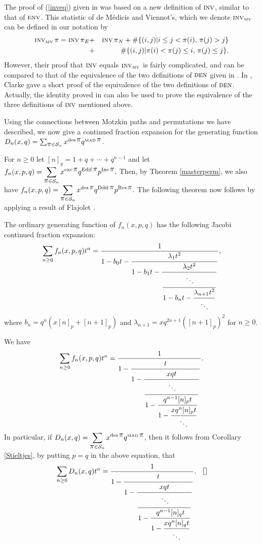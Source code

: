 The proof of (\ref{inveq}) given in \cite{medvie} was based on a new definition
of $\mathop{\mbox{\sc inv}}\nolimits$, similar to that of $\mathop{\mbox{\sc env}}\nolimits$. This statistic of de M\'edicis and
Viennot's, which we denote $\mathop{\mbox{\sc inv}}_{\mbox{$\rm\scriptscriptstyle MV$}}\nolimits$ can be defined in our notation by
\begin{eqnarray}
\mathop{\mbox{\sc inv}}_{\mbox{$\rm\scriptscriptstyle MV$}}\nolimits \mbox{$\pi$} =\mathop{\mbox{\sc inv}}\nolimits \mbox{$\pi$}_E&+&\mathop{\mbox{\sc inv}}\nolimits \mbox{$\pi$}_N +\#\{(i,j)|i\leq j<\mbox{$\pi$}(i),\,
\mbox{$\pi$}(j)> j\}\label{invbis}\cr &+&\#\{(i,j)|\mbox{$\pi$}(i)<\mbox{$\pi$}(j)\leq i, \, \mbox{$\pi$}(j)\leq j\}.
\end{eqnarray}
However, their proof that $\mathop{\mbox{\sc inv}}\nolimits$ equals $\mathop{\mbox{\sc inv}}_{\mbox{$\rm\scriptscriptstyle MV$}}\nolimits$ is fairly
complicated, and can be compared to that of the equivalence of the two
definitions of $\mathop{\mbox{\sc den}}\nolimits$ given in \cite{FZ}. In \cite{clarke}, Clarke
gave a short proof of the equivalence of the two definitions of
$\mathop{\mbox{\sc den}}\nolimits$. Actually, the identity proved in \cite{clarke} can also be
used to prove the equivalence of the three definitions of $\mathop{\mbox{\sc inv}}\nolimits$
mentioned above.


Using the connections between Motzkin paths and permutations we have
described, we now give a continued fraction expansion for the
generating function $D_n(x, q)=\sum_{\mbox{$\pi$} \in {\cal S}_n}{x^{\mathop{\rm des}\mbox{$\pi$}}q^{\mathop{\mbox{$\rm\scriptscriptstyle MAD$}}\mbox{$\pi$}}}$.





For $n\geq 0$ let $[n]_q=1+q+\cdots +q^{n-1}$ and let $\displaystyle f_n(x, p,
q)=\sum_{\mbox{$\pi$}\in {\cal S}_n}x^{\mathop{\rm exc} \mbox{$\pi$} }q^{\mathop{\rm Edif} \mbox{$\pi$} }p^{\mathop{\rm Ine} \mbox{$\pi$} }. $ Then,
by Theorem \ref{masterperm}, we also have $\displaystyle f_n(x, p, q)=\sum_{\mbox{$\pi$}
  \in {\cal S}_n}x^{\mathop{\rm des} \mbox{$\pi$}}q^{\mathop{\rm Ddif} \mbox{$\pi$} }p^{\mathop{\rm Res} \mbox{$\pi$} }. $ The following
theorem now follows by applying a result of Flajolet \cite[Theorem
1]{fla}.

\begin{thm}
The ordinary generating function of $f_n(x, p, q)$ has the following Jacobi
continued fraction expansion:
$$ \sum_{n\geq 0}f_n(x,p, q)t^n={1\over\displaystyle 1-b_0t- {\strut
\lambda_1t^2\over\displaystyle 1-b_1t- {\strut
\lambda_2t^2\over\displaystyle {}
{\strut \ddots\over\displaystyle 1-b_nt- {\strut
\lambda_{n+1}t^2\over\displaystyle \ddots }}}}}, $$
where $b_n=q^n(x[n]_p+[n+1]_p)$ and $\lambda_{n+1}=xq^{2n+1}([n+1]_p)^2$
for $n\geq 0$.
\end{thm}

\begin{cor}\label{Stieltjes}  We have
\begin{eqnarray}
\sum_{n\geq 0}f_n(x,p,q)t^n={1\over\displaystyle 1- {\strut t\over\displaystyle
1- {\strut xqt\over\displaystyle {} {\strut \ddots\over\displaystyle 1- {\strut
q^{n-1}[n]_pt\over\displaystyle 1- {\strut xq^n[n]_pt\over\displaystyle \ddots
}}}}}}.
\end{eqnarray}
%
In particular, if $\displaystyle D_n(x, q)= \sum_{\mbox{$\pi$} \in {\cal S}_n}
{x^{\mathop{\rm des}\mbox{$\pi$}}q^{\mathop{\mbox{$\rm\scriptscriptstyle MAD$}}\mbox{$\pi$}}}$, then it follows from Corollary
\ref{Stieltjes}, by putting $p=q$ in the above equation, that
\begin{eqnarray}
\sum_{n\geq 0}D_n(x,q)t^n= {1\over\displaystyle 1- {\strut
t\over\displaystyle 1-
{\strut xqt\over\displaystyle {} {\strut \ddots\over\displaystyle 1- {\strut
q^{n-1}[n]_qt\over\displaystyle 1- {\strut xq^n[n]_qt\over\displaystyle \ddots
}}}}}}.\qel\label{dfrac}
\end{eqnarray}
\end{cor}


